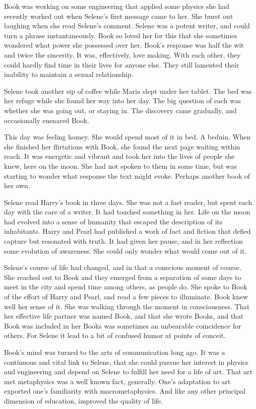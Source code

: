 Book was working on some engineering that applied some physics she had
recently worked out when Selene's first message came to her.  She
burst out laughing when she read Selene's comment.  Selene was a
potent writer, and could turn a phrase instantaneously.  Book so loved
her for this that she sometimes wondered what power she possessed over
her.  Book's response was half the wit and twice the sincerity.  It
was, effectively, love making.  With each other, they could hardly
find time in their lives for anyone else.  They still lamented their
inability to maintain a sexual relationship.

Selene took another sip of coffee while Maria slept under her tablet.
The bed was her refuge while she found her way into her day.  The big
question of each was whether she was going out, or staying in.  The
discovery came gradually, and occasionally ensnared Book.

This day was feeling homey.  She would spend most of it in bed.  A
beduin.  When she finished her flirtations with Book, she found the
next page waiting within reach.  It was energetic and vibrant and took
her into the lives of people she knew, here on the moon.  She had not
spoken to them in some time, but was starting to wonder what response
the text might evoke.  Perhaps another book of her own.

\vfill
\break

﻿Selene read Harry's book in three days.  She was not a fast reader,
but spent each day with the care of a writer.  It had touched
something in her.  Life on the moon had evolved into a sense of
humanity that escaped the description of its inhabitants.  Harry and
Pearl had published a work of fact and fiction that defied capture but
resonated with truth.  It had given her pause, and in her reflection
some evolution of awareness.  She could only wonder what would come
out of it.

Selene's course of life had changed, and in that a conscious moment of
course.  She reached out to Book and they emerged from a separation of
some days to meet in the city and spend time among others, as people
do.  She spoke to Book of the effort of Harry and Pearl, and read a
few pieces to illuminate.  Book knew well her sense of it.  She was
walking through the moment in consciousness.  That her effective life
partner was named Book, and that she wrote Books, and that Book was
included in her Books was sometimes an unbearable coincidence for
others.  For Selene it lead to a bit of confused humor at points of
conceit.

Book's mind was turned to the arts of communication long ago.  It was
a continuous and vital link to Selene, that she could pursue her
interest in physics and engineering and depend on Selene to fulfill
her need for a life of art.  That art met metaphysics was a well known
fact, generally.  One's adaptation to art exported one's familiarity
with macrometaphysics.  And like any other principal dimension of
education, improved the quality of life.

\bye
